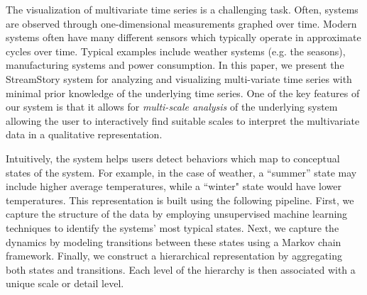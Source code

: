 The visualization of multivariate time series is a challenging task. Often, systems are observed through one-dimensional measurements graphed over time. Modern systems often have many different sensors which 
typically operate in approximate cycles over time. Typical examples include weather systems (e.g. the seasons), manufacturing systems and power consumption. 
%
In this paper, we  present the StreamStory system for analyzing and visualizing multi-variate time series with minimal prior knowledge of the underlying time series. One of the key features of our system is that it allows for  \emph{multi-scale analysis} of the underlying system allowing the user to interactively find suitable scales to interpret the multivariate data in a qualitative representation.  

Intuitively, the system helps users detect behaviors which map to conceptual states of the system. For example, in the case of weather, a ``summer'' state may include higher average temperatures, while a ``winter" state would have lower temperatures. 
%
This representation is built using the following pipeline. First, we capture the structure of the data by employing unsupervised machine learning
techniques to identify the systems' most typical states. Next, we capture the
dynamics by modeling transitions between these states using a Markov chain framework.
Finally, we construct a hierarchical representation by aggregating both
states and transitions. Each level of the hierarchy is then associated with a unique
scale or detail level.

